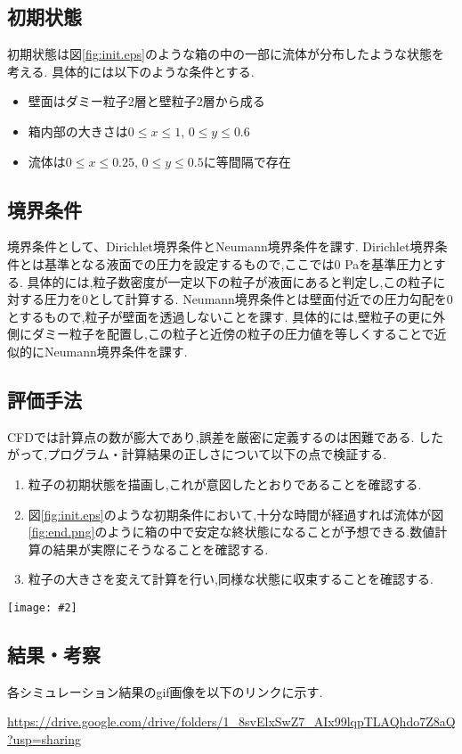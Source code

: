 \documentclass[uplatex,a4j,11pt]{jsarticle}
\makeatletter
\def\fgcaption{\def\@captype{figure}\caption}
\newcommand{\mfig}[3][width=15cm]{
\begin{center}
    \texttt{[image: \#2]}
\fgcaption{#3 \label{fig:#2}}
\end{center}
}
\makeatother
\begin{document}
\subsection{初期状態}
\label{sec:init}
初期状態は図\ref{fig:init.eps}のような箱の中の一部に流体が分布したような状態を考える.
具体的には以下のような条件とする.
\begin{itemize}
    \item 壁面はダミー粒子2層と壁粒子2層から成る
    \item 箱内部の大きさは$0\leq x\leq1$, $0\leq y\leq 0.6$
    \item 流体は$0\leq x\leq0.25$, $0\leq y\leq 0.5$に等間隔で存在
\end{itemize}
\subsection{境界条件}
境界条件として、Dirichlet境界条件とNeumann境界条件を課す.
Dirichlet境界条件とは基準となる液面での圧力を設定するもので,ここでは0 Paを基準圧力とする.
具体的には,粒子数密度が一定以下の粒子が液面にあると判定し,この粒子に対する圧力を0として計算する.
Neumann境界条件とは壁面付近での圧力勾配を0とするもので,粒子が壁面を透過しないことを課す.
具体的には,壁粒子の更に外側にダミー粒子を配置し,この粒子と近傍の粒子の圧力値を等しくすることで近似的にNeumann境界条件を課す.
\subsection{評価手法}
\label{sec:eval}
CFDでは計算点の数が膨大であり,誤差を厳密に定義するのは困難である.
したがって,プログラム・計算結果の正しさについて以下の点で検証する.
\begin{enumerate}
    \item 粒子の初期状態を描画し,これが意図したとおりであることを確認する.
    \item 図\ref{fig:init.eps}のような初期条件において,十分な時間が経過すれば流体が図\ref{fig:end.png}のように箱の中で安定な終状態になることが予想できる.数値計算の結果が実際にそうなることを確認する.
    \item 粒子の大きさを変えて計算を行い,同様な状態に収束することを確認する.
\end{enumerate}
\mfig[width=10cm]{end.png}{終状態}
\subsection{結果・考察}
各シミュレーション結果のgif画像を以下のリンクに示す.

\url{https://drive.google.com/drive/folders/1_8svElxSwZ7_AIx99lqpTLAQhdo7Z8aQ?usp=sharing}
\end{document}
